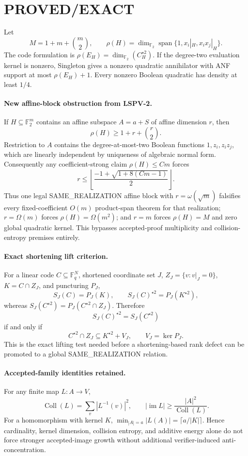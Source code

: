 \documentclass[11pt]{article}
\begin{document}
\section*{PROVED/EXACT}
Let
\[ M=1+m+\binom m2,\qquad \rho(H)=\dim_{\mathbb F_2}\operatorname{span}\{1,x_i|_H,x_ix_j|_H\}. \]
The code formulation is \(\rho(E_H)=\dim_{\mathbb F_2}(C_H^{\star2})\). If the degree-two evaluation kernel is nonzero, Singleton gives a nonzero quadratic annihilator with ANF support at most \(\rho(E_H)+1\). Every nonzero Boolean quadratic has density at least \(1/4\).

\paragraph{New affine-block obstruction from LSPV-2.}
If \(H\subseteq\mathbb F_2^m\) contains an affine subspace \(A=a+S\) of affine dimension \(r\), then
\[ \boxed{\rho(H)\ge 1+r+\binom r2.} \]
Restriction to \(A\) contains the degree-at-most-two Boolean functions \(1,z_i,z_i z_j\), which are linearly independent by uniqueness of algebraic normal form. Consequently any coefficient-strong claim \(\rho(H)\le Cm\) forces
\[ \boxed{r\le \left\lfloor\frac{-1+\sqrt{1+8(Cm-1)}}{2}\right\rfloor.} \]
Thus one legal SAME\_REALIZATION affine block with \(r=\omega(\sqrt m)\) falsifies every fixed-coefficient \(O(m)\) product-span theorem for that realization; \(r=\Omega(m)\) forces \(\rho(H)=\Omega(m^2)\); and \(r=m\) forces \(\rho(H)=M\) and zero global quadratic kernel. This bypasses accepted-proof multiplicity and collision-entropy premises entirely.

\paragraph{Exact shortening lift criterion.}
For a linear code \(C\subseteq\mathbb F_q^N\), shortened coordinate set \(J\), \(Z_J=\{v:v|_J=0\}\), \(K=C\cap Z_J\), and puncturing \(P_J\),
\[ S_J(C)=P_J(K),\qquad S_J(C)^{\star2}=P_J(K^{\star2}), \]
whereas \(S_J(C^{\star2})=P_J(C^{\star2}\cap Z_J)\). Therefore
\[ \boxed{S_J(C)^{\star2}=S_J(C^{\star2})} \]
if and only if
\[ \boxed{C^{\star2}\cap Z_J\subseteq K^{\star2}+V_J,}\qquad V_J=\ker P_J. \]
This is the exact lifting test needed before a shortening-based rank defect can be promoted to a global SAME\_REALIZATION relation.

\paragraph{Accepted-family identities retained.}
For any finite map \(L:A\to V\),
\[ \operatorname{Coll}(L)=\sum_v|L^{-1}(v)|^2,\qquad |\operatorname{im}L|\ge \frac{|A|^2}{\operatorname{Coll}(L)}. \]
For a homomorphism with kernel \(K\), \(\min_{|A|=a}|L(A)|=\lceil a/|K|\rceil\). Hence cardinality, kernel dimension, collision entropy, and additive energy alone do not force stronger accepted-image growth without additional verifier-induced anti-concentration.
\end{document}
